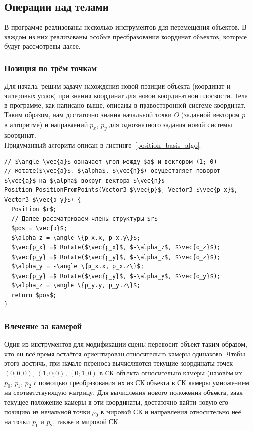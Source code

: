 \documentclass[a4paper,12pt]{report}
\numberwithin{equation}{section}
\begin{document}
\subsection{Операции над телами}
В программе реализованы несколько инструментов для перемещения объектов. В каждом из них реализованы особые преобразования координат объектов, которые будут рассмотрены далее.

\subsubsection{Позиция по трём точкам}
Для начала, решим задачу нахождения новой позиции объекта (координат и эйлеровых углов) при знании координат для новой координатной плоскости. Тела в программе, как написано выше, описаны в правосторонней системе координат. Таким образом, нам достаточно знания начальной точки $O$ (заданной вектором $p$ в алгоритме) и направлений $p_x$, $p_y$ для однозначного задания новой системы координат. \\
Придуманный алгоритм описан в листинге~\ref{position_basis_algo}.

\begin{lstlisting}[float=h!,caption={Позиция по трём точкам},label=position_basis_algo]
// $\angle \vec{a}$ означает угол между $a$ и вектором (1; 0)
// Rotate($\vec{a}$, $\alpha$, $\vec{n}$) осуществляет поворот $\vec{a}$ на $\alpha$ вокруг вектора $\vec{n}$
Position PositionFromPoints(Vector3 $\vec{p}$, Vector3 $\vec{p_x}$, Vector3 $\vec{p_y}$) {
  Position $r$;
  // Далее рассматриваем члены структуры $r$
  $pos = \vec{p}$;
  $\alpha_z = \angle \{p_x.x, p_x.y\}$;
  $\vec{p_x} =$ Rotate($\vec{p_x}$, $-\alpha_z$, $\vec{o_z}$);
  $\vec{p_y} =$ Rotate($\vec{p_y}$, $-\alpha_z$, $\vec{o_z}$);
  $\alpha_y = -\angle \{p_x.x, p_x.z\}$;
  $\vec{p_y} =$ Rotate($\vec{p_y}$, $-\alpha_y$, $\vec{o_y}$);
  $\alpha_z = \angle \{p_y.y, p_y.z\}$;
  return $pos$;
}
\end{lstlisting}

\subsubsection{Влечение за камерой}
Один из инструментов для модификации сцены переносит объект таким образом, что он всё время остаётся ориентирован относительно камеры одинаково. Чтобы этого достичь, при начале переноса вычисляются текущие координаты точек $(0; 0; 0)$, $(1; 0; 0)$, $(0; 1; 0)$ в СК объекта относительно камеры (назовём их $p_0$, $p_1$, $p_2$ c помощью преобразования их из СК объекта в СК камеры умножением на соответствующую матрицу. Для вычисления нового положения объекта, зная текущее положение камеры и эти координаты, достаточно найти новую его позицию из начальной точки $p_0$ в мировой СК и направления относительно неё на точки $p_1$ и $p_2$, также в мировой СК.
\end{document}
